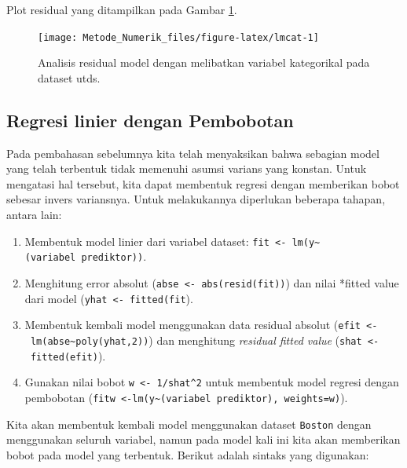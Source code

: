 \documentclass[]{book}
\providecommand{\tightlist}{%
  \setlength{\itemsep}{0pt}\setlength{\parskip}{0pt}}
\theoremstyle{definition}
\theoremstyle{definition}
\theoremstyle{definition}
\theoremstyle{remark}
\begin{document}
Plot residual yang ditampilkan pada Gambar \ref{fig:lmcat}.

\begin{figure}

{\centering \texttt{[image: Metode\_Numerik\_files/figure-latex/lmcat-1]} 

}

\caption{Analisis residual model dengan melibatkan variabel kategorikal pada dataset utds.}\label{fig:lmcat}
\end{figure}

\hypertarget{wlr}{%
\subsection{Regresi linier dengan Pembobotan}\label{wlr}}

Pada pembahasan sebelumnya kita telah menyaksikan bahwa sebagian model yang telah terbentuk tidak memenuhi asumsi varians yang konstan. Untuk mengatasi hal tersebut, kita dapat membentuk regresi dengan memberikan bobot sebesar invers variansnya. Untuk melakukannya diperlukan beberapa tahapan, antara lain:

\begin{enumerate}
\def\labelenumi{\arabic{enumi}.}
\tightlist
\item
  Membentuk model linier dari variabel dataset: \texttt{fit\ \textless{}-\ lm(y\textasciitilde{}(variabel\ prediktor))}.
\item
  Menghitung error absolut (\texttt{abse\ \textless{}-\ abs(resid(fit))}) dan nilai *fitted value dari model (\texttt{yhat\ \textless{}-\ fitted(fit}).
\item
  Membentuk kembali model menggunakan data residual absolut (\texttt{efit\ \textless{}-\ lm(abse\textasciitilde{}poly(yhat,2))}) dan menghitung \emph{residual fitted value} (\texttt{shat\ \textless{}-\ fitted(efit)}).
\item
  Gunakan nilai bobot \texttt{w\ \textless{}-\ 1/shat\^{}2} untuk membentuk model regresi dengan pembobotan (\texttt{fitw\ \textless{}-lm(y\textasciitilde{}(variabel\ prediktor),\ weights=w)}).
\end{enumerate}

Kita akan membentuk kembali model menggunakan dataset \texttt{Boston} dengan menggunakan seluruh variabel, namun pada model kali ini kita akan memberikan bobot pada model yang terbentuk. Berikut adalah sintaks yang digunakan:
\end{document}
